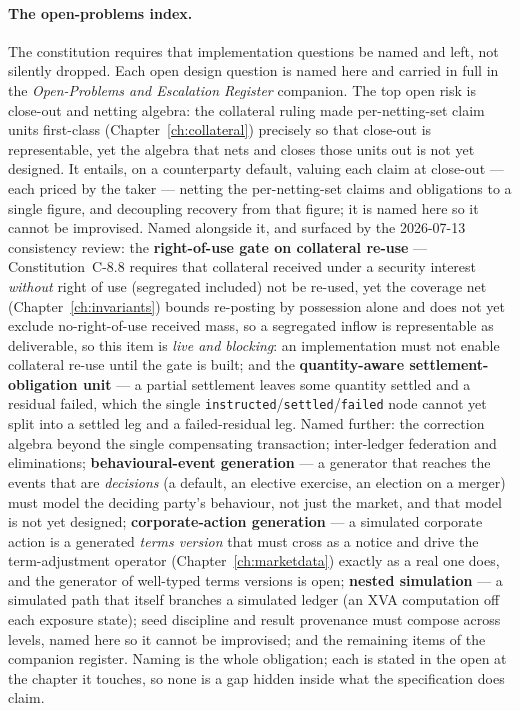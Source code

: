 \paragraph{The open-problems index.} The constitution requires that implementation
questions be named and left, not silently dropped. Each open design question is named here
and carried in full in the \emph{Open-Problems and Escalation Register} companion. The
top open risk is close-out and netting algebra: the collateral ruling made
per-netting-set claim units first-class (Chapter~\ref{ch:collateral}) precisely so that
close-out is representable, yet the algebra that nets and closes those units out is not yet
designed. It entails, on a counterparty default, valuing each claim at close-out --- each
priced by the taker --- netting the per-netting-set claims and obligations to a single
figure, and decoupling recovery from that figure; it is named here so it cannot be
improvised. Named alongside it, and surfaced by the 2026-07-13 consistency review: the
\textbf{right-of-use gate on collateral re-use} --- Constitution~C-8.8 requires that
collateral received under a security interest \emph{without} right of use (segregated
included) not be re-used, yet the coverage net (Chapter~\ref{ch:invariants}) bounds
re-posting by possession alone and does not yet exclude no-right-of-use received mass, so a
segregated inflow is representable as deliverable, so this item is \emph{live and
blocking}: an implementation must not enable collateral re-use until the gate is built;
and the \textbf{quantity-aware
settlement-obligation unit} --- a partial settlement leaves some quantity settled and a
residual failed, which the single \texttt{instructed}/\texttt{settled}/\texttt{failed} node
cannot yet split into a settled leg and a failed-residual leg. Named further: the correction
algebra beyond the single compensating transaction; inter-ledger federation and
eliminations; \textbf{behavioural-event generation} --- a generator that reaches the events
that are \emph{decisions} (a default, an elective exercise, an election on a merger) must
model the deciding party's behaviour, not just the market, and that model is not yet designed;
\textbf{corporate-action generation} --- a simulated corporate action is a generated
\emph{terms version} that must cross as a notice and drive the term-adjustment operator
(Chapter~\ref{ch:marketdata}) exactly as a real one does, and the generator of well-typed
terms versions is open; \textbf{nested simulation} --- a simulated path that itself branches
a simulated ledger (an XVA computation off each exposure state); seed discipline and result
provenance must compose across levels, named here so it cannot be improvised; and the
remaining items of the companion register. Naming
is the whole obligation; each is stated in the open at the chapter it touches, so none is a
gap hidden inside what the specification does claim.

